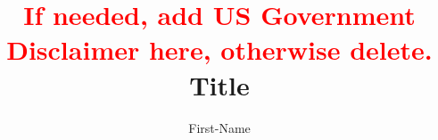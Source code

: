\documentclass{uscthesis}
\title{
		\textcolor{red}{If needed, add US Government Disclaimer here, otherwise delete.} \\
		\vspace{6mm}
	Title }
\author{First-Name}{Last-Name}    %
\begin{document}




%
%       
                           
%
%
%
%
%
%
%
 
 

\Appendix                 %
	
\end{document}

